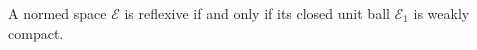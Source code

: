 A normed space $\mathcal{E}$ is reflexive if and only if its closed unit ball $\mathcal{E}_1$ is weakly compact.
